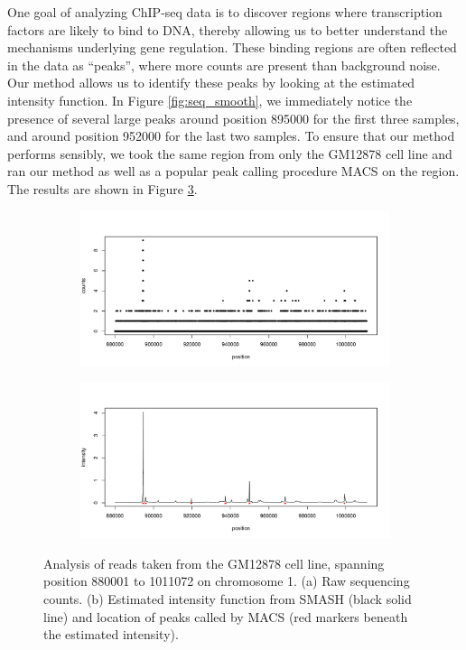 \documentclass[12pt]{article}
\begin{document}
\bigskip
One goal of analyzing ChIP-seq data is to discover regions where transcription factors are likely to bind to DNA, thereby allowing us to better understand the mechanisms underlying gene regulation. These binding regions are often reflected in the data as ``peaks'', where more counts are present than background noise. Our method allows us to identify these peaks by looking at the estimated intensity function. In Figure \ref{fig:seq_smooth}, we immediately notice the presence of several large peaks around position 895000 for the first three samples, and around position 952000 for the last two samples. To ensure that our method performs sensibly, we took the same region from only the GM12878 cell line and ran our method as well as a popular peak calling procedure MACS on the region. The results are shown in Figure \ref{fig:seq_peak}.\\
\newpage
\begin{figure}[h]
\centering
    \begin{subfigure}[b]{0.85\textwidth}
        \centering
        \includegraphics[width=\textwidth]{peaks_comp_a.pdf}
        \caption{}
        \label{fig:seq_peak_data}
    \end{subfigure}

    \begin{subfigure}[b]{0.85\textwidth}
        \centering
        \includegraphics[width=\textwidth]{peaks_comp_b.pdf}
        \caption{}
        \label{fig:seq_peak_est}
    \end{subfigure}
    \caption{Analysis of reads taken from the GM12878 cell line, spanning position 880001 to 1011072 on chromosome 1. (a) Raw sequencing counts. (b) Estimated intensity function from SMASH (black solid line) and location of peaks called by MACS (red markers beneath the estimated intensity).}
    \label{fig:seq_peak}
\end{figure}
\end{document}
